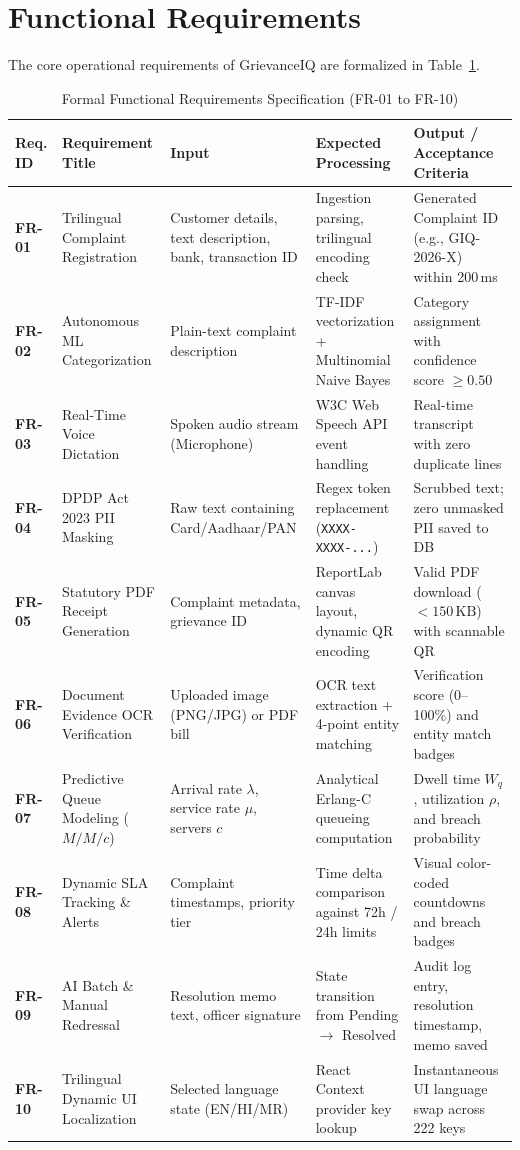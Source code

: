 \section{Functional Requirements}
The core operational requirements of GrievanceIQ are formalized in Table~\ref{tab:functional_requirements}.

\begin{table}[p]
\centering
\caption{Formal Functional Requirements Specification (FR-01 to FR-10)}
\label{tab:functional_requirements}
\begin{tabular}{|p{1.4cm}|p{3.2cm}|p{3.2cm}|p{3.2cm}|p{3.4cm}|}
\hline
\textbf{Req. ID} & \textbf{Requirement Title} & \textbf{Input} & \textbf{Expected Processing} & \textbf{Output / Acceptance Criteria} \\ \hline
\textbf{FR-01} & Trilingual Complaint Registration & Customer details, text description, bank, transaction ID & Ingestion parsing, trilingual encoding check & Generated Complaint ID (e.g., GIQ-2026-X) within 200\,ms \\ \hline
\textbf{FR-02} & Autonomous ML Categorization & Plain-text complaint description & TF-IDF vectorization + Multinomial Naive Bayes & Category assignment with confidence score $\ge 0.50$ \\ \hline
\textbf{FR-03} & Real-Time Voice Dictation & Spoken audio stream (Microphone) & W3C Web Speech API event handling & Real-time transcript with zero duplicate lines \\ \hline
\textbf{FR-04} & DPDP Act 2023 PII Masking & Raw text containing Card/Aadhaar/PAN & Regex token replacement (\texttt{XXXX-XXXX-...}) & Scrubbed text; zero unmasked PII saved to DB \\ \hline
\textbf{FR-05} & Statutory PDF Receipt Generation & Complaint metadata, grievance ID & ReportLab canvas layout, dynamic QR encoding & Valid PDF download ($< 150\,\text{KB}$) with scannable QR \\ \hline
\textbf{FR-06} & Document Evidence OCR Verification & Uploaded image (PNG/JPG) or PDF bill & OCR text extraction + 4-point entity matching & Verification score (0--100\%) and entity match badges \\ \hline
\textbf{FR-07} & Predictive Queue Modeling ($M/M/c$) & Arrival rate $\lambda$, service rate $\mu$, servers $c$ & Analytical Erlang-C queueing computation & Dwell time $W_q$, utilization $\rho$, and breach probability \\ \hline
\textbf{FR-08} & Dynamic SLA Tracking \& Alerts & Complaint timestamps, priority tier & Time delta comparison against 72h / 24h limits & Visual color-coded countdowns and breach badges \\ \hline
\textbf{FR-09} & AI Batch \& Manual Redressal & Resolution memo text, officer signature & State transition from Pending $\rightarrow$ Resolved & Audit log entry, resolution timestamp, memo saved \\ \hline
\textbf{FR-10} & Trilingual Dynamic UI Localization & Selected language state (EN/HI/MR) & React Context provider key lookup & Instantaneous UI language swap across 222 keys \\ \hline
\end{tabular}
\end{table}

